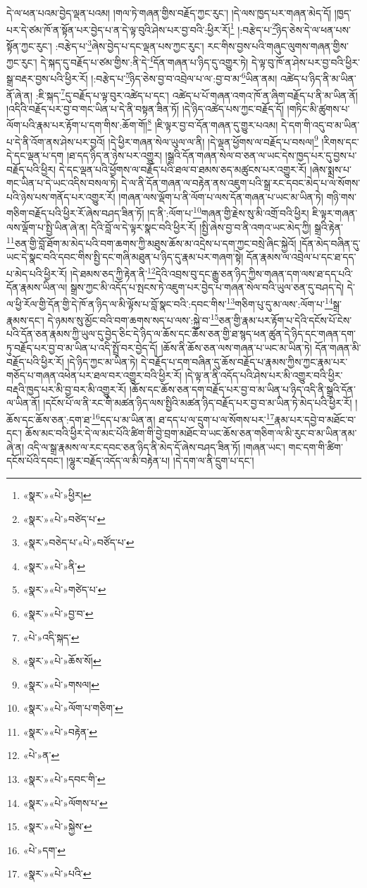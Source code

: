 དེ་ལ་ཕན་པའམ་བྱེད་ལྡན་པའམ། །གལ་ཏེ་གཞན་གྱིས་བརྗོད་ཀྱང་རུང་། །དེ་ལས་ཁྱད་པར་གཞན་མེད་དོ། །ཁྱད་པར་དེ་ཙམ་ཁོ་ན་སྟོན་པར་བྱེད་པ་ན་དེ་ལྟ་བུའི་ཤེས་པར་བྱ་བའི་:ཕྱིར་རོ།\footnote{«སྣར་»«པེ་»ཕྱིར།} །:བརྩེད་པ་\footnote{«སྣར་»«པེ་»བཙེད་པ་}ཉིད་ཅེས་དེ་ལ་ཕན་པས་སྟོན་ཀྱང་རུང་། :བརྩེད་པ་\footnote{«སྣར་»བཅེད་པ་«པེ་»བཙོད་པ་}ཞེས་བྱེད་པ་དང་ལྡན་པས་ཀྱང་རུང་། རང་གིས་བྱས་པའི་གཞུང་ལུགས་གཞན་གྱིས་ཀྱང་རུང་། དེ་སྐད་དུ་བརྗོད་པ་ཙམ་གྱིས་:ནི་དེ་\footnote{«སྣར་»«པེ་»ནི་}དོན་གཞན་པ་ཉིད་དུ་འགྱུར་ཏེ། དེ་ལྟ་བུ་ཁོ་ན་ཤེས་པར་བྱ་བའི་ཕྱིར་སྒྲ་བརྡར་བྱས་པའི་ཕྱིར་རོ། །:བརྩེད་པ་\footnote{«སྣར་»«པེ་»གཙེད་པ་}ཉིད་ཅེས་བྱ་བ་འབྲེལ་པ་ལ་:བྱ་བ་མ་\footnote{«སྣར་»«པེ་»བྱ་བ་}ཡིན་ནམ། འཚེད་པ་ཉིད་ནི་མ་ཡིན་ནོ་ཞེ་ན། :ཇི་སྐད་\footnote{«པེ་»འདི་སྐད་}དུ་བརྗོད་པ་ལྟ་བུར་འཚེད་པ་དང་། འཚེད་པ་པོ་གཞན་འགའ་ཁོ་ན་ཞིག་བརྗོད་པ་ནི་མ་ཡིན་ནོ། །འདིའི་བརྗོད་པར་བྱ་བ་གང་ཡིན་པ་དེ་ནི་བསྟན་ཟིན་ཏོ། །དེ་ཉིད་འཚེད་པས་ཀྱང་བརྗོད་དོ། །གཏིང་མི་ཚུགས་པ་ལོག་པའི་རྣམ་པར་རྟོག་པ་དག་གིས་:ཆོག་གོ།\footnote{«སྣར་»«པེ་»ཆོས་སོ།} །ཇི་ལྟར་བྱ་བ་དོན་གཞན་དུ་གྱུར་པའམ། དེ་དག་གི་འདུ་བ་མ་ཡིན་པ་དེ་ནི་འོག་ནས་ཤེས་པར་བྱའོ། །དེ་ཕྱིར་གཞན་སེལ་ཡུལ་ལ་ནི། །དེ་ལྡན་ཕྱོགས་ལ་བརྗོད་པ་བསལ།\footnote{«སྣར་»«པེ་»གསལ།} །རིགས་དང་དེ་དང་ལྡན་པ་དག །ཐ་དད་ཉིད་ན་ཉེས་པར་འགྱུར། །སྒྲའི་དོན་གཞན་སེལ་བ་ཅན་ལ་ཡང་དེས་ཁྱད་པར་དུ་བྱས་པ་བརྗོད་པའི་ཕྱིར། དེ་དང་ལྡན་པའི་ཕྱོགས་ལ་བརྗོད་པའི་ཐལ་བ་ཐམས་ཅད་མཚུངས་པར་འགྱུར་རོ། །ཞེས་སྨྲས་པ་གང་ཡིན་པ་དེ་ཡང་འདིས་བསལ་ཏེ། དེ་ལ་ནི་དོན་གཞན་ལ་བརྟེན་ནས་འཇུག་པའི་སྒྲ་རང་དབང་མེད་པ་ལ་སོགས་པའི་ཉེས་པས་གནོད་པར་འགྱུར་རོ། །གཞན་ལས་ལྡོག་པ་ནི་ལོག་པ་ལས་དོན་གཞན་པ་ཡང་མ་ཡིན་ཏེ། གཉི་གས་གཅིག་བརྗོད་པའི་ཕྱིར་རོ་ཞེས་བཤད་ཟིན་ཏོ། །ད་ནི་:ལོག་པ་\footnote{«སྣར་»«པེ་»ལོག་པ་གཅིག་}གཞན་གྱི་རྗེས་སུ་མི་འགྲོ་བའི་ཕྱིར། ཇི་ལྟར་གཞན་ལས་ལྡོག་པ་སྤྱི་ཡིན་ཞེ་ན། དེའི་བློ་ལ་དེ་ལྟར་སྣང་བའི་ཕྱིར་རོ། །སྤྱི་ཞེས་བྱ་བ་ནི་འགའ་ཡང་མེད་ཀྱི། སྒྲའི་རྟེན་\footnote{«སྣར་»«པེ་»བརྟེན་}ཅན་གྱི་བློ་ཐོག་མ་མེད་པའི་བག་ཆགས་ཀྱི་མཐུས་ཆོས་མ་འདྲེས་པ་དག་ཀྱང་བསྲེ་ཞིང་སྐྱེའོ། །དོན་མེད་བཞིན་དུ་ཡང་དེ་སྣང་བའི་དབང་གིས་སྤྱི་དང་གཞི་མཐུན་པ་ཉིད་དུ་རྣམ་པར་གཞག་སྟེ། དོན་རྣམས་ལ་འབྲེལ་པ་དང་ཐ་དད་པ་མེད་པའི་ཕྱིར་རོ། །དེ་ཐམས་ཅད་ཀྱི་རྟེན་ནི་\footnote{«པེ་»ན་}དེའི་འབྲས་བུ་དང་རྒྱུ་ཅན་ཉིད་ཀྱིས་གཞན་དག་ལས་ཐ་དད་པའི་དོན་རྣམས་ཡིན་ལ། སྒྲས་ཀྱང་མི་འདོད་པ་སྤངས་ཏེ་འཇུག་པར་བྱེད་པ་གཞན་སེལ་བའི་ཡུལ་ཅན་དུ་བཤད་དེ། དེ་ལ་ཕྱི་རོལ་གྱི་དོན་གྱི་དེ་ཁོ་ན་ཉིད་ལ་མི་ལྟོས་པ་བློ་སྣང་བའི་:དབང་གིས་\footnote{«སྣར་»«པེ་»དབང་གི་}གཅིག་པུ་དུ་མ་ལས་:ལོག་པ་\footnote{«སྣར་»«པེ་»ལོགས་པ་}སྒྲ་རྣམས་དང་། དེ་ཉམས་སུ་མྱོང་བའི་བག་ཆགས་སད་པ་ལས་:སྐྱེ་བ་\footnote{«སྣར་»«པེ་»སྐྱེས་}ཅན་གྱི་རྣམ་པར་རྟོག་པ་དེའི་དངོས་པོ་ངེས་པའི་དོན་ཅན་རྣམས་ཀྱི་ཡུལ་དུ་བྱེད་ཅིང་དེ་ཉིད་ལ་ཆོས་དང་ཆོས་ཅན་གྱི་ཐ་སྙད་ཕན་ཚུན་དེ་ཉིད་དང་གཞན་དག་ཏུ་བརྗོད་པར་བྱ་བ་མ་ཡིན་པ་འདི་སྤྲོ་བར་བྱེད་དོ། །ཆོས་ནི་ཆོས་ཅན་ལས་གཞན་པ་ཡང་མ་ཡིན་ཏེ། དོན་གཞན་མི་བརྗོད་པའི་ཕྱིར་རོ། །དེ་ཉིད་ཀྱང་མ་ཡིན་ཏེ། དེ་བརྗོད་པ་དག་བཞིན་དུ་ཆོས་བརྗོད་པ་རྣམས་ཀྱིས་ཀྱང་རྣམ་པར་གཅོད་པ་གཞན་འཕེན་པར་ཐལ་བར་འགྱུར་བའི་ཕྱིར་རོ། །དེ་ལྟ་ན་ནི་འདོད་པའི་ཤེས་པར་མི་འགྱུར་བའི་ཕྱིར་བརྡའི་ཁྱད་པར་མི་བྱ་བར་མི་འགྱུར་རོ། །ཆོས་དང་ཆོས་ཅན་དག་བརྗོད་པར་བྱ་བ་མ་ཡིན་པ་ཉིད་འདི་ནི་སྒྲའི་དོན་ལ་ཡིན་ནོ། །དངོས་པོ་ལ་ནི་རང་གི་མཚན་ཉིད་ལས་སྤྱིའི་མཚན་ཉིད་བརྗོད་པར་བྱ་བ་མ་ཡིན་ཏེ་མེད་པའི་ཕྱིར་རོ། །ཆོས་དང་ཆོས་ཅན་:དག་ཐ་\footnote{«པེ་»དག་}དད་པ་མ་ཡིན་ན། ཐ་དད་པ་ལ་དྲུག་པ་ལ་སོགས་པར་\footnote{«སྣར་»«པེ་»པའི་}རྣམ་པར་དབྱེ་བ་མཐོང་བ་དང་། ཆོས་མང་བའི་ཕྱིར་དེ་ལ་མང་པོའི་ཚིག་གི་བྱེ་བྲག་མཐོང་བ་ཡང་ཆོས་ཅན་གཅིག་ལ་མི་རུང་བ་མ་ཡིན་ནམ་ཞེ་ན། འདི་ལ་སྒྲ་རྣམས་ལ་རང་དབང་ཅན་ཉིད་ནི་མེད་དོ་ཞེས་བཤད་ཟིན་ཏོ། །གཞན་ཡང་། གང་དག་གི་ཚིག་དངོས་པོའི་དབང་། །ལྷུར་བརྗོད་འདོད་ལ་མི་བརྟེན་པ། །དེ་དག་ལ་ནི་དྲུག་པ་དང་། 
